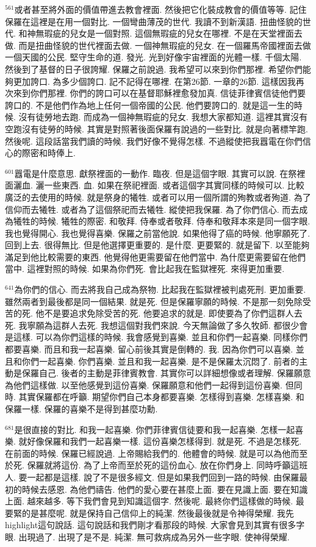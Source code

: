\documentclass{book}
\begin{document}
$^{561}$或者甚至將外面的價值帶進去教會裡面.
然後把它化裝成教會的價值等等.
記住保羅在這裡是在用一個對比.
一個彎曲薄茂的世代.
我讀不到新漢語.
扭曲怪貌的世代.
和神無瑕疵的兒女是一個對照.
這個無瑕疵的兒女在哪裡.
不是在天堂裡面去做.
而是扭曲怪貌的世代裡面去做.
一個神無瑕疵的兒女.
在一個羅馬帝國裡面去做一個天國的公民.
堅守生命的道.
發光.
光到好像宇宙裡面的光體一樣.
千個太陽.
然後到了基督的日子很誇耀.
保羅之前說過.
我希望可以來到你們那裡.
希望你們能夠更加誇口.
為多少個誇口.
記不記得在哪裡.
在第26節.
一章的26節.
這樣因我再次來到你們那裡.
你們的誇口可以在基督耶穌裡愈發加真.
信徒菲律賓信徒他們要誇口的.
不是他們作為地上任何一個帝國的公民.
他們要誇口的.
就是這一生的時候.
沒有徒勞地去跑.
而成為一個神無瑕疵的兒女.
我想大家都知道.
這裡其實沒有空跑沒有徒勞的時候.
其實是對照著後面保羅有說過的一些對比.
就是向著標竿跑.
然後呢.
這段話當我們讀的時候.
我們好像不覺得怎樣.
不過縱使把我囂電在你們信心的際密和時俸上.

$^{601}$囂電是什麼意思.
獻祭裡面的一動作.
臨夜.
但是這個字眼.
其實可以說.
在祭裡面灑血.
灑一些東西.
血.
如果在祭祀裡面.
或者這個字其實同樣的時候可以.
比較廣泛的去使用的時候.
就是祭身的犧牲.
或者可以用一個所謂的殉教或者殉道.
為了信仰而去犧牲.
或者為了這個祭祀而去犧牲.
縱使把我保羅.
為了你們信心.
而去成為犧牲的時候.
犧牲的際密.
和敬拜.
侍奉或者敬拜.
侍奉和敬拜本來是同一個字眼.
我也覺得開心.
我也覺得喜樂.
保羅之前當他說.
如果他得了癌的時候.
他寧願死了.
回到上去.
很得無比.
但是他選擇更重要的.
是什麼.
更要緊的.
就是留下.
以至能夠滿足到他比較需要的東西.
他覺得他更需要留在他們當中.
為什麼更需要留在他們當中.
這裡對照的時候.
如果為你們死.
會比起我在監獄裡死.
來得更加重要.

$^{641}$為你們的信心.
而去將我自己成為祭物.
比起我在監獄裡被判處死刑.
更加重要.
雖然兩者到最後都是同一個結果.
就是死.
但是保羅寧願的時候.
不是那一刻免除受苦的死.
他不是要追求免除受苦的死.
他要追求的就是.
即使要為了你們這群人去死.
我寧願為這群人去死.
我想這個對我們來說.
今天無論做了多久牧師.
都很少會是這樣.
可以為你們這樣的時候.
我會感覺到喜樂.
並且和你們一起喜樂.
同樣你們都要喜樂.
而且和我一起喜樂.
留心前後其實是倒轉的.
我.
因為你們可以喜樂.
並且和你們一起喜樂.
你們喜樂.
並且和我一起喜樂.
是不是保羅太沉悶了.
前者的主動是保羅自己.
後者的主動是菲律賓教會.
其實你可以詳細想像或者理解.
保羅願意為他們這樣做.
以至他感覺到這份喜樂.
保羅願意和他們一起得到這份喜樂.
但同時.
其實保羅都在呼籲.
期望你們自己本身都要喜樂.
怎樣得到喜樂.
怎樣喜樂.
和保羅一樣.
保羅的喜樂不是得到甚麼功勳.

$^{681}$是很直接的對比.
和我一起喜樂.
你們菲律賓信徒要和我一起喜樂.
怎樣一起喜樂.
就好像保羅和我們一起喜樂一樣.
這份喜樂怎樣得到.
就是死.
不過是怎樣死.
在前面的時候.
保羅已經說過.
上帝賜給我們的.
他體會的時候.
就是可以為他而至於死.
保羅就將這份.
為了上帝而至於死的這份血心.
放在你們身上.
同時呼籲這班人.
要一起都是這樣.
說了不是很多經文.
但是如果我們回到一路的時候.
由保羅最初的時候去感恩.
為他們禱告.
他們的愛心要在甚麼上面.
要在見識上面.
要在知識上面.
越來越多.
等下我們會見到知識這個字.
然後呢.
最終你們這樣做的時候.
最要緊的是甚麼呢.
就是保持自己信仰上的純潔.
然後最後就是令神得榮耀.
我先highlight這句說話.
這句說話和我們剛才看那段的時候.
大家會見到其實有很多字眼.
出現過了.
出現了是不是.
純潔.
無可救病成為另外一些字眼.
使神得榮耀.
\end{document}

